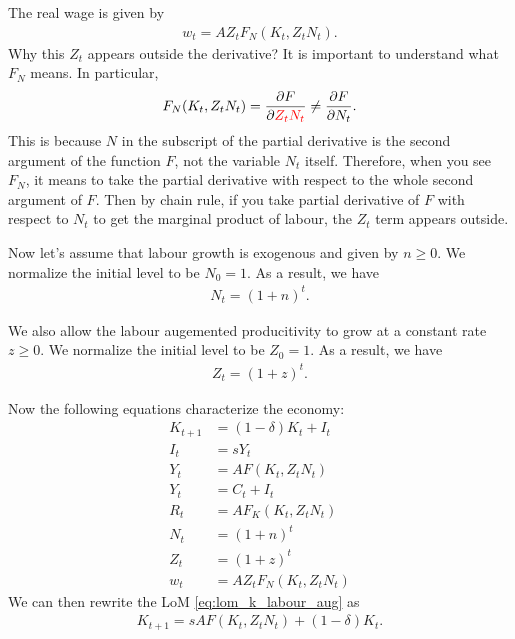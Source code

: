 \documentclass{book}
\theoremstyle{definition}
\theoremstyle{plain}
\begin{document}
The real wage is given by
\begin{align*}
    w_t = A Z_t F_N(K_t, Z_t N_t).
\end{align*}
Why this $Z_t$ appears outside the derivative? It is important to understand what $F_N$ means. In particular,
\begin{align*}
    F_N(K_t, Z_t N_t) = \frac{\partial F}{\partial {\color{red}Z_t N_t}} \neq \frac{\partial F}{\partial N_t}.
\end{align*}
This is because $N$ in the subscript of the partial derivative is the {\color{red} second argument} of the function $F$, not the variable $N_t$ itself. Therefore, when you see $F_N$, it means to take the partial derivative with respect to the whole second argument of $F$. Then by chain rule, if you take partial derivative of $F$ with respect to $N_t$ to get the marginal product of labour, the $Z_t$ term appears outside.

Now let's assume that labour growth is exogenous and given by $n \geq 0$. We normalize the initial level to be $N_0 = 1$. As a result, we have 
\begin{align*}
    N_t = (1+n)^t.
\end{align*}

We also allow the labour augemented producitivity to grow at a constant rate $z\geq0$. We normalize the initial level to be $Z_0 = 1$. As a result, we have 
\begin{align*}
    Z_t = (1+z)^t.
\end{align*}

Now the following equations characterize the economy:
\begin{align}
    K_{t+1} &= (1-\delta) K_t + I_t \label{eq:lom_k_labour_aug} \\
    I_t &= s Y_t \label{eq:investment_labour_aug} \\
    Y_t &= A F(K_t, Z_t N_t) \label{eq:prod_func_labour_aug} \\
    Y_t &= C_t + I_t \label{eq:output_consumption_investment_labour_aug} \\
    R_t &= A F_K(K_t, Z_t N_t) \label{eq:real_return_capital_labour_aug} \\
    N_t &= (1+n)^t \label{eq:n_t} \\
    Z_t &= (1+z)^t \label{eq:z_t} \\
    w_t &= A Z_t F_N(K_t, Z_t N_t) \label{eq:real_wage_labour_aug}
\end{align}
We can then rewrite the LoM \eqref{eq:lom_k_labour_aug} as
\begin{align}\label{eq:lom_k_labour_aug_rewrite}
    K_{t+1} = s A F(K_t, Z_t N_t) + (1-\delta) K_t.
\end{align}
\end{document}
